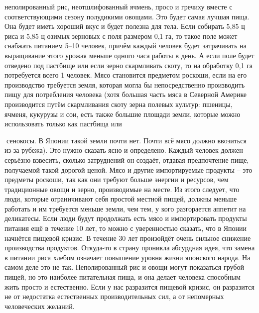 \documentclass[a4paper]{book}
\begin{document}
неполированный рис, неотшлифованный ячмень, просо и гречиху вместе с
соответствующими сезону полудикими овощами. Это будет самая лучшая пища. Она будет
иметь хороший вкус и будет полезна для тела. Если собирать 5,85 ц риса и 5,85 ц озимых
зерновых с поля размером 0,1 га, то такое поле может снабжать питанием 5–10 человек,
причём каждый человек будет затрачивать на выращивание этого урожая меньше одного часа
работы в день. А если поле будет отведено под пастбище или если зерно скармливать скоту,
то на обработку 0,1 га потребуется всего 1 человек. Мясо становится предметом роскоши,
если на его производство требуется земля, которая могла бы непосредственно производить
пищу для потребления человека (хотя большая часть мяса в Северной Америке производится
путём скармливания скоту зерна полевых культур: пшеницы, ячменя, кукурузы и сои, есть
также большие площади земли, которые можно использовать только как пастбища или

сенокосы. В Японии такой земли почти нет. Почти всё мясо должно ввозиться из-за рубежа).
Это нужно сказать ясно и определено. Каждый человек должен серьёзно взвесить,
сколько затруднений он создаёт, отдавая предпочтение пище, получаемой такой дорогой
ценой.
Мясо и другие импортируемые продукты – это предметы роскоши, так как они требуют
больше энергии и ресурсов, чем традиционные овощи и зерно, производимые на месте. Из
этого следует, что люди, которые ограничивают себя простой местной пищей, должны
меньше работать и им требуется меньше земли, чем тем, у кого разгорается аппетит на
деликатесы.
Если люди будут продолжать есть мясо и импортировать продукты питания ещё в
течение 10 лет, то можно с уверенностью сказать, что в Японии начнётся пищевой кризис. В
течение 30 лет произойдёт очень сильное снижение производства продуктов. Откуда-то в
страну проникла абсурдная идея, что замена в питании риса хлебом означает повышение
уровня жизни японского народа. На самом деле это не так. Неполированный рис и овощи
могут показаться грубой пищей, но это наиболее питательная пища, и она делает человека
способным жить просто и естественно.
Если у нас разразится пищевой кризис, он разразится не от недостатка естественных
производительных сил, а от непомерных человеческих желаний.
\end{document}
